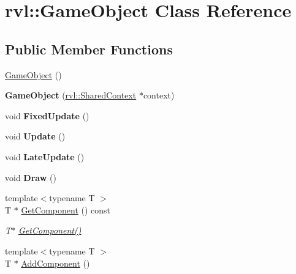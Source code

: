 \hypertarget{classrvl_1_1_game_object}{}\section{rvl\+:\+:Game\+Object Class Reference}
\label{classrvl_1_1_game_object}
\subsection*{Public Member Functions}
\begin{DoxyCompactItemize}
\item 
\hyperlink{classrvl_1_1_game_object_a0348e3ee2e83d56eafca7a3547f432c4}{Game\+Object} ()
\item 
\mbox{\label{classrvl_1_1_game_object_a6ad2b16e8f9e749ec2ee9598d4d3ae8d}} 
{\bfseries Game\+Object} (\hyperlink{structrvl_1_1_shared_context}{rvl\+::\+Shared\+Context} $\ast$context)
\item 
\mbox{\label{classrvl_1_1_game_object_a275a49882a7d619adef9698fee03fdab}} 
void {\bfseries Fixed\+Update} ()
\item 
\mbox{\label{classrvl_1_1_game_object_a3d0364d2a33aaadb0a00e530bd7d54c3}} 
void {\bfseries Update} ()
\item 
\mbox{\label{classrvl_1_1_game_object_a81751a7dfa6c0210449aa66fb731807c}} 
void {\bfseries Late\+Update} ()
\item 
\mbox{\label{classrvl_1_1_game_object_a69e5c86216b242ae78efa64ffde2ac17}} 
void {\bfseries Draw} ()
\item 
{\footnotesize template$<$typename T $>$ }\\T $\ast$ \hyperlink{classrvl_1_1_game_object_a84322da781cdc35cc352e4aaac5f9e47}{Get\+Component} () const
\begin{DoxyCompactList}\small\item\em T$\ast$ \hyperlink{classrvl_1_1_game_object_a84322da781cdc35cc352e4aaac5f9e47}{Get\+Component()} \end{DoxyCompactList}\item 
{\footnotesize template$<$typename T $>$ }\\T $\ast$ \hyperlink{classrvl_1_1_game_object_a84757644ca964d0f24e003d35bec60a7}{Add\+Component} ()

\end{DoxyCompactItemize}
